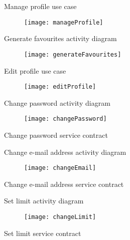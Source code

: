 \documentclass[12pt]{article}
\begin{document}
\item Manage profile use case\\
\begin{figure}[h!]
  \centering
    \texttt{[image: manageProfile]} 
\end{figure}

\item Generate favourites activity diagram\\
\begin{figure}[h!]
  \centering
    \texttt{[image: generateFavourites]} 
\end{figure}

\item Edit profile use case\\
\begin{figure}[h!]
  \centering
    \texttt{[image: editProfile]} 
\end{figure}

\item Change password activity diagram\\
\begin{figure}[h!]
  \centering
    \texttt{[image: changePassword]} 
\end{figure}

\item Change password service contract\\

\item Change e-mail address activity diagram\\
\begin{figure}[h!]
  \centering
    \texttt{[image: changeEmail]} 
\end{figure}

\item Change e-mail address service contract\\

\item Set limit activity diagram\\
\begin{figure}[h!]
  \centering
    \texttt{[image: changeLimit]} 
\end{figure}

\item Set limit service contract\\
\end{document}
